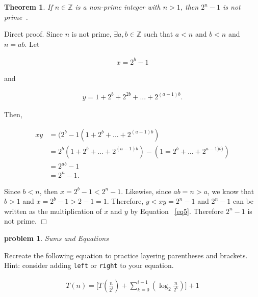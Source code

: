 \documentclass[10pt]{article}
\newenvironment{proof}{\par\noindent{\it Proof.}\hspace*{1em}}{$\Box$\bigskip}
\newtheorem{problem}{\sc\color{cit}problem}
\newtheorem{theorem}{Theorem}
\newcommand{\Z}{\mathbb{Z}} %
\begin{document}
\begin{theorem}
    If $n \in \Z$ is a non-prime integer with $n>1$, then $2^n - 1$ is not prime~\cite{velleman}.
\end{theorem}

\begin{proof}
    Direct proof. Since $n$ is not prime, $\exists a, b \in \Z$ such that $a < n$ and $b < n$ and $n = ab$. Let 
    
    \begin{align*}
        x = 2^b - 1
    \end{align*}
    
    and
    
    \begin{align*}
        y = 1 + 2^b + 2^{2b} + ... + 2^{(a-1)b}.
    \end{align*}
    
    Then,
    
    \begin{align}
        \label{eq2}
        xy &= (2^b - 1 (1 + 2^b + ... + 2^{(a-1)b}) \\
        \label{eq3}
        &= 2^b(1 + 2^b + ... + 2^{(a-1)b}) - (1 = 2^b + ... + 2^{a-1)b)}) \\
        \label{eq4}
        &= 2^{ab} - 1 \\
        \label{eq5}
        &= 2^n - 1.
    \end{align}
    
    \noindent Since $b < n$, then $x = 2^b - 1 < 2^n - 1$. Likewise, since $ab = n > a$, we know that $b > 1$ and $x = 2^b - 1 > 2 - 1 = 1$. Therefore, $y < xy = 2^n - 1$ and $2^n - 1$ can be written as the multiplication of $x$ and $y$ by Equation ~\ref{eq5}. Therefore $2^n - 1$ is not prime.
\end{proof}





\begin{problem} Sums and Equations \end{problem}

Recreate the following equation to practice layering parentheses and brackets.  Hint: consider adding \verb|left| or \verb|right| to your equation.

\begin{align*}
    T(n) = \Bigg [T(\frac{n}{2^i}) + \sum _{k=0}^{i-1}(\log_2\frac{n}{2^k}) \Bigg ] + 1
\end{align*}
\end{document}
